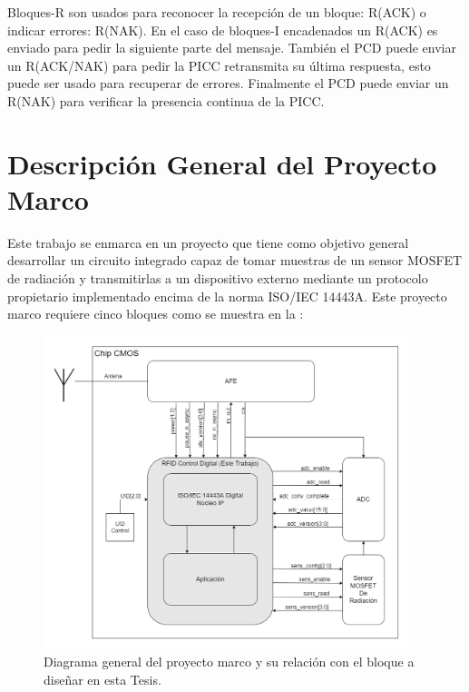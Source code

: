 \documentclass[a4paper, twoside, 11pt]{report}
\begin{document}
Bloques-R son usados para reconocer la recepción de un bloque: R(ACK) o indicar errores: R(NAK). En el caso de bloques-I encadenados un R(ACK) es enviado para pedir la siguiente parte del mensaje. También el PCD puede enviar un R(ACK/NAK) para pedir la PICC retransmita su última respuesta, esto puede ser usado para recuperar de errores. Finalmente el PCD puede enviar un R(NAK) para verificar la presencia continua de la PICC.


\FloatBarrier
\chapter{Descripción General del Proyecto Marco}

Este trabajo se enmarca en un proyecto que tiene como objetivo general desarrollar un circuito integrado capaz de tomar muestras de un sensor MOSFET de radiación y transmitirlas a un dispositivo externo mediante un protocolo propietario implementado encima de la norma ISO/IEC 14443A. Este proyecto marco requiere cinco bloques como se muestra en la :

\begin{figure}[htb]
  \centering
  \includegraphics[width=0.95\textwidth]{./img/entire_project_v2}
  \caption{Diagrama general del proyecto marco y su relación con el bloque a diseñar en esta Tesis.}
  \label{fig:entire_project}
\end{figure}
\end{document}
